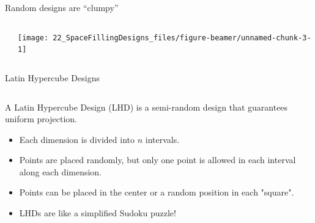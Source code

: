 \documentclass[
  9pt,
  ignorenonframetext,
]{beamer}
\begin{document}
\begin{frame}{Random designs are ``clumpy''}
\protect\hypertarget{random-designs-are-clumpy}{}
\begin{columns}
\begin{column}{0.6\textwidth}


\end{column}
\begin{column}{0.4\textwidth}

\begin{center}\texttt{[image: 22\_SpaceFillingDesigns\_files/figure-beamer/unnamed-chunk-3-1]} \end{center}

\end{column}
\end{columns}
\end{frame}

\begin{frame}{Latin Hypercube Designs}
\protect\hypertarget{latin-hypercube-designs}{}
\begin{columns}
\begin{column}{0.6\textwidth}

A Latin Hypercube Design (LHD) is a semi-random design that guarantees uniform projection.

\medskip
\begin{itemize}
  \item Each dimension is divided into $n$ intervals.
  \item Points are placed randomly, but only one point is allowed in each interval along each dimension.
  \item Points can be placed in the center or a random position in each "square".
  \item LHDs are like a simplified Sudoku puzzle!
\end{itemize}

\end{column}
\begin{column}{0.4\textwidth}


\medskip
{}

\end{column}
\end{columns}
\end{frame}
\end{document}
